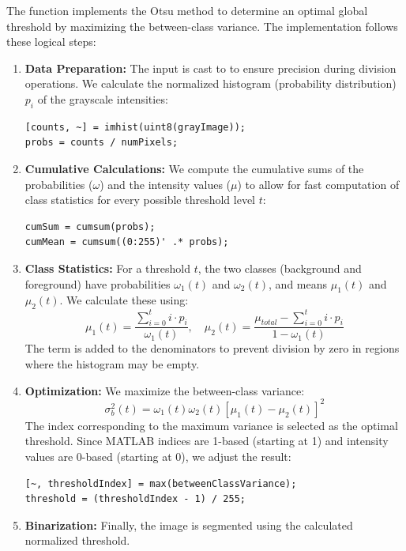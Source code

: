 \documentclass[12pt]{article}
\begin{document}
	 The function  implements the Otsu method to determine an optimal global threshold by maximizing the between-class variance. The implementation follows these logical steps:
	 
	 \begin{enumerate}
	 	\item \textbf{Data Preparation:} The input is cast to  to ensure precision during division operations. We calculate the normalized histogram (probability distribution) $p_i$ of the grayscale intensities:
	 	\begin{lstlisting}
[counts, ~] = imhist(uint8(grayImage));
probs = counts / numPixels;
	 	\end{lstlisting}
	 	
	 	\item \textbf{Cumulative Calculations:} We compute the cumulative sums of the probabilities ($\omega$) and the intensity values ($ \mu $) to allow for fast computation of class statistics for every possible threshold level $t$:
	 	\begin{lstlisting}
cumSum = cumsum(probs);
cumMean = cumsum((0:255)' .* probs);
	 	\end{lstlisting}
	 	
	 	\item \textbf{Class Statistics:} For a threshold $t$, the two classes (background and foreground) have probabilities $\omega_1(t)$ and $\omega_2(t)$, and means $\mu_1(t)$ and $\mu_2(t)$. We calculate these using:
	 	\begin{equation}
	 		\mu_1(t) = \frac{\sum_{i=0}^{t} i \cdot p_i}{\omega_1(t)}, \quad \mu_2(t) = \frac{\mu_{total} - \sum_{i=0}^{t} i \cdot p_i}{1 - \omega_1(t)}
	 	\end{equation}
	 	The term  is added to the denominators to prevent division by zero in regions where the histogram may be empty.
	 	
	 	\item \textbf{Optimization:} We maximize the between-class variance:
	 	\begin{equation}
	 		\sigma_b^2(t) = \omega_1(t)\omega_2(t)[\mu_1(t) - \mu_2(t)]^2
	 	\end{equation}
	 	The index corresponding to the maximum variance is selected as the optimal threshold. Since MATLAB indices are 1-based (starting at 1) and intensity values are 0-based (starting at 0), we adjust the result:
	 	\begin{lstlisting}
[~, thresholdIndex] = max(betweenClassVariance);
threshold = (thresholdIndex - 1) / 255;
	 	\end{lstlisting}
	 	
	 	\item \textbf{Binarization:} Finally, the image is segmented using the calculated normalized threshold.
	 \end{enumerate}
	 
\end{document}
